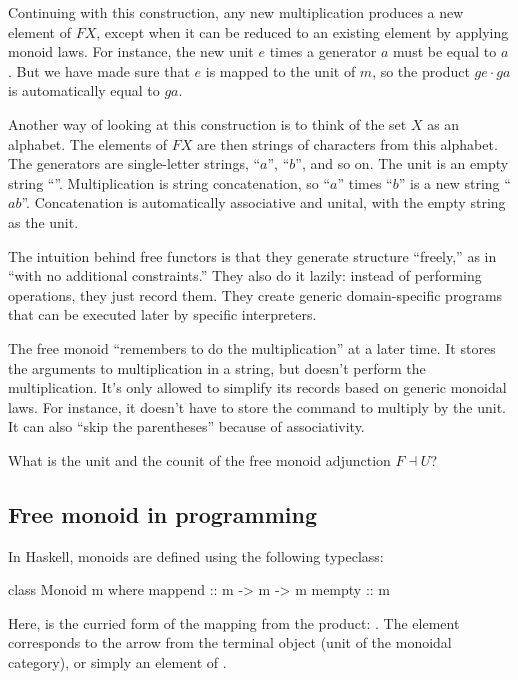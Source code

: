 \documentclass[DaoFP]{subfiles}
\begin{document}
Continuing with this construction, any new multiplication produces a new element of $F X$, except when it can be reduced to an existing element by applying monoid laws. For instance, the new unit $e$ times a generator $a$ must be equal to $a$. But we have made sure that $e$ is mapped to the unit of $m$, so the product $g e \cdot g a$ is automatically equal to $g a$.

Another way of looking at this construction is to think of the set $X$ as an alphabet. The elements of $F X$ are then strings of characters from this alphabet. The generators are single-letter strings, ``$a$'', ``$b$'', and so on. The unit is an empty string ``''. Multiplication is string concatenation, so  ``$a$'' times ``$b$'' is a new string ``$ab$''. Concatenation is automatically associative and unital, with the empty string as the unit.

The intuition behind free functors is that they generate structure ``freely,'' as in ``with no additional constraints.'' They also do it lazily: instead of performing operations, they just record them. They create generic domain-specific programs that can be executed later by specific interpreters.

The free monoid ``remembers to do the multiplication'' at a later time. It stores the arguments to multiplication in a string, but doesn't perform the multiplication. It's only allowed to simplify its records based on generic monoidal laws. For instance, it doesn't have to store the command to multiply by the unit. It can also ``skip the parentheses'' because of associativity. 

\begin{exercise}
What is the unit and the counit of the free monoid adjunction $F \dashv U$?
\end{exercise}

\subsection{Free monoid in programming}

In Haskell, monoids are defined using the following typeclass:
\begin{haskell}
class Monoid m where
  mappend :: m -> m -> m
  mempty  :: m
\end{haskell}
Here,  is the curried form of the mapping from the product: . The  element corresponds to the arrow from the terminal object (unit of the monoidal category), or simply an element of . 
\end{document}
